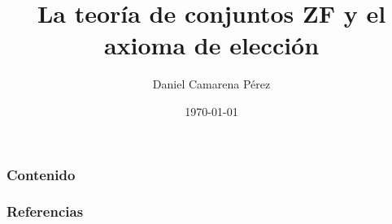 \documentclass[12pt]{beamer} %
\title[Elección y matemática]{La teoría de conjuntos ZF y el axioma de elección}
\author[Daniel Camarena]{Daniel Camarena Pérez} %
\institute[UNI]{Universidad Nacional de Ingeniería}
\date{\today} %
\begin{document}

\begin{frame}[plain] %
\titlepage 
\end{frame}

\begin{frame}[allowframebreaks]
\frametitle{Contenido} %
\tableofcontents 
\end{frame}







\begin{frame}[allowframebreaks]
\frametitle{Referencias}
%

\end{frame}

\begin{frame}
\end{frame}
\end{document}
